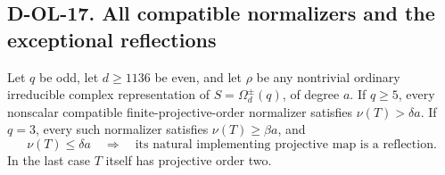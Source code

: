 \subsection*{D-OL-17. All compatible normalizers and the exceptional reflections}

\begin{theorem}[D-OL-17]
Let $q$ be odd, let $d\ge1136$ be even, and let $\rho$ be any
nontrivial ordinary irreducible complex representation of
$S=\Omega_d^\pm(q)$, of degree $a$.  If $q\ge5$, every nonscalar
compatible finite-projective-order normalizer satisfies
$\nu(T)>\delta a$.  If $q=3$, every such normalizer satisfies
$\nu(T)\ge\beta a$, and
\[
 \nu(T)\le\delta a\quad\Longrightarrow\quad
 \text{its natural implementing projective map is a reflection}.
 \tag{OE.14}
\]
In the last case $T$ itself has projective order two.
\end{theorem}

